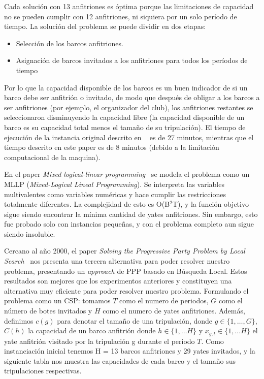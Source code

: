 \documentclass[letter, 10pt]{article}
\begin{document}
Cada solución con 13 anfitriones es óptima porque las limitaciones de capacidad no se pueden cumplir con 12 anfitriones, ni siquiera por un solo período de tiempo. La solución del problema se puede dividir en dos etapas: 

\begin{itemize}
    \item Selección de los barcos anfitriones.
    \item Asignación de barcos invitados a los anfitriones para todos los períodos de tiempo
\end{itemize}

Por lo que la capacidad disponible de los barcos es un buen indicador de si un barco debe ser anfitrión o invitado, de modo que después de obligar a los barcos a ser anfitriones (por ejemplo, el organizador del club), los anfitriones restantes se seleccionaron disminuyendo la capacidad libre (la capacidad disponible de un barco es su capacidad total menos el tamaño de su tripulación). El tiempo de ejecución de la instancia original descrito en ~\cite{Smith1996} es de 27 minutos, mientras que el tiempo descrito en este paper es de 8 minutos (debido a la limitación computacional de la maquina). 

En el paper \textit{Mixed logical-linear programming}~\cite{Hooker1999395} se modela el problema como un MLLP (\textit{Mixed-Logical Lineal Programming}). Se interpreta las variables multivalentes como variables numéricas y hace cumplir las restricciones totalmente diferentes. La complejidad de esto es O(B$^2$T), y la función objetivo sigue siendo encontrar la mínima cantidad de yates anfitriones.
Sin embargo, esto fue probado solo con instancias pequeñas, y con el problema completo aun sigue siendo insoluble.

Cercano al año 2000, el paper \textit{Solving the Progressive Party Problem by Local Search}~\cite{Galinier1999} nos presenta una tercera alternativa para poder resolver nuestro problema, presentando un \textit{approach} de PPP basado en Búsqueda Local. Estos resultados son mejores que los experimentos anteriores y constituyen una alternativa muy eficiente para poder resolver nuestro problema. Formulando el problema como un CSP: tomamos $T$ como el numero de periodos, $G$ como el número de botes invitados y $H$ como el numero de yates anfitriones. Además, definimos $c(g)$ para denotar el tamaño de una tripulación, donde  $g \in \{ 1,\ldots, G\}$, $C(h)$ la capacidad de un barco anfitrión donde $h \in \{ 1,\ldots H\}$ y $x_{g,t} \in \{ 1,\ldots H\}$ el yate anfitrión visitado por la tripulación g durante el periodo $T$. Como instanciación inicial tenemos H = 13 barcos anfitriones y 29 yates invitados, y la siguiente tabla nos muestra las capacidades de cada barco y el tamaño sus tripulaciones respectivas.
\end{document}
